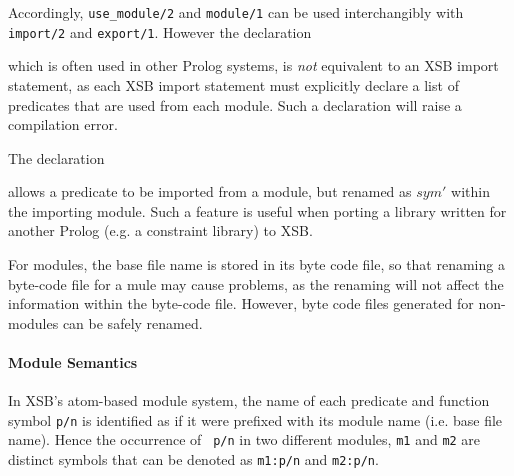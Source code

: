 
\noindent
Accordingly, {\tt use\_module/2} and {\tt module/1} can be used
interchangibly with {\tt import/2} and {\tt export/1}.  However the
declaration


\noindent
which is often used in other Prolog systems, is {\em not} equivalent
to an XSB import statement, as each XSB import statement must
explicitly declare a list of predicates that are used from each
module.  Such a declaration will raise a compilation error.

The declaration 


\noindent
allows a predicate to be imported from a module, but renamed as $sym'$
within the importing module.  Such a feature is useful when porting a
library written for another Prolog (e.g. a constraint library) to XSB.

For modules, the base file name is stored in its byte code file, so
that renaming a byte-code file for a mule may cause problems, as the
renaming will not affect the information within the byte-code file.
However, byte code files generated for non-modules can be safely
renamed.

\paragraph*{Module Semantics} 
%
In XSB's atom-based module system, the name of each predicate and
function symbol {\tt p/n} is identified as if it were prefixed with
its module name (i.e. base file name).  Hence the occurrence of {\tt
  p/n} in two different modules, {\tt m1} and {\tt m2} are distinct
symbols that can be denoted as {\tt m1:p/n} and {\tt m2:p/n}.  

